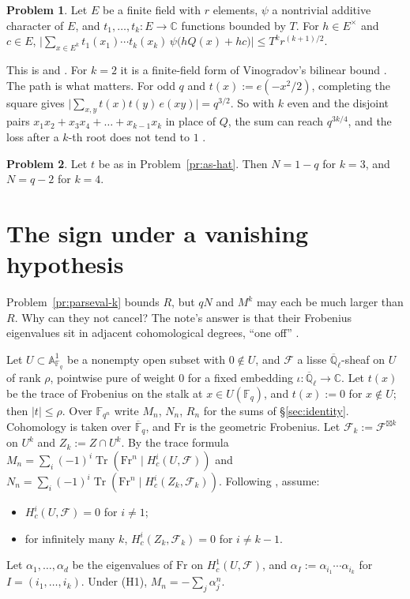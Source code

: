 \documentclass[reqno]{amsart}
\theoremstyle{definition}
\newtheorem{problem}{Problem}[section]
\theoremstyle{plain}
\newcommand{\Q}{\mathbb{Q}}
\newcommand{\C}{\mathbb{C}}
\newcommand{\F}{\mathbb{F}}
\newcommand{\A}{\mathbb{A}}
\newcommand{\Fb}{\overline{\F}_q}
\newcommand{\Ql}{\overline{\Q}_\ell}
\newcommand{\cF}{\mathcal{F}}
\newcommand{\Fr}{\mathrm{Fr}}
\newcommand{\Tr}{\operatorname{Tr}}
\newcommand{\e}{e}
\begin{document}
\begin{problem}\label{pr:vector}
Let \(E\) be a finite field with \(r\) elements, \(\psi\) a nontrivial additive character of \(E\), and \(t_1, \dots, t_k \colon E \to \C\) functions bounded by \(T\).  For \(h \in E^\times\) and \(c \in E\),
\(\bigl\lvert \sum_{x \in E^k} t_1(x_1) \cdots t_k(x_k)\, \psi\bigl(hQ(x) + hc\bigr) \bigr\rvert \le T^k r^{(k+1)/2}\).
\end{problem}

This is \cite[Lemma~2.6]{Zh} and \cite[Lemma~3]{Ald}.  For \(k = 2\) it is a finite-field form of Vinogradov's bilinear bound \cite[Remark~2.7]{Zh}.  The path is what matters.  For odd \(q\) and \(t(x) := \e(-x^2/2)\), completing the square gives \(\lvert \sum_{x,y} t(x)t(y)\,\e(xy) \rvert = q^{3/2}\).  So with \(k\) even and the disjoint pairs \(x_1x_2 + x_3x_4 + \dots + x_{k-1}x_k\) in place of \(Q\), the sum can reach \(q^{3k/4}\), and the loss after a \(k\)-th root does not tend to \(1\) \cite[Remark~2.7]{Zh}.

\begin{problem}\label{pr:as-small}
Let \(t\) be as in Problem~\ref{pr:as-hat}.  Then \(N = 1 - q\) for \(k = 3\), and \(N = q - 2\) for \(k = 4\).
\end{problem}

\section{The sign under a vanishing hypothesis}\label{sec:cohomology}

Problem~\ref{pr:parseval-k} bounds \(R\), but \(qN\) and \(M^k\) may each be much larger than \(R\).  Why can they not cancel?  The note's answer is that their Frobenius eigenvalues sit in adjacent cohomological degrees, ``one off'' \cite[footnote~3]{Alp}.

Let \(U \subset \A^1_{\F_q}\) be a nonempty open subset with \(0 \notin U\), and \(\cF\) a lisse \(\Ql\)-sheaf on \(U\) of rank \(\rho\), pointwise pure of weight \(0\) for a fixed embedding \(\iota \colon \Ql \to \C\).  Let \(t(x)\) be the trace of Frobenius on the stalk at \(x \in U(\F_q)\), and \(t(x) := 0\) for \(x \notin U\); then \(\lvert t \rvert \le \rho\).  Over \(\F_{q^n}\) write \(M_n\), \(N_n\), \(R_n\) for the sums of \S\ref{sec:identity}.  Cohomology is taken over \(\Fb\), and \(\Fr\) is the geometric Frobenius.  Let \(\cF_k := \cF^{\boxtimes k}\) on \(U^k\) and \(Z_k := Z \cap U^k\).  By the trace formula \(M_n = \sum_i (-1)^i \Tr(\Fr^n \mid H^i_c(U, \cF))\) and \(N_n = \sum_i (-1)^i \Tr(\Fr^n \mid H^i_c(Z_k, \cF_k))\).  Following \cite[\S 2.10]{Dup}, assume:
\begin{itemize}
\item[(H1)] \(H^i_c(U, \cF) = 0\) for \(i \ne 1\);
\item[(H2)] for infinitely many \(k\), \(H^i_c(Z_k, \cF_k) = 0\) for \(i \ne k - 1\).
\end{itemize}
Let \(\alpha_1, \dots, \alpha_d\) be the eigenvalues of \(\Fr\) on \(H^1_c(U, \cF)\), and \(\alpha_I := \alpha_{i_1} \cdots \alpha_{i_k}\) for \(I = (i_1, \dots, i_k)\).  Under (H1), \(M_n = -\sum_j \alpha_j^n\).
\end{document}
